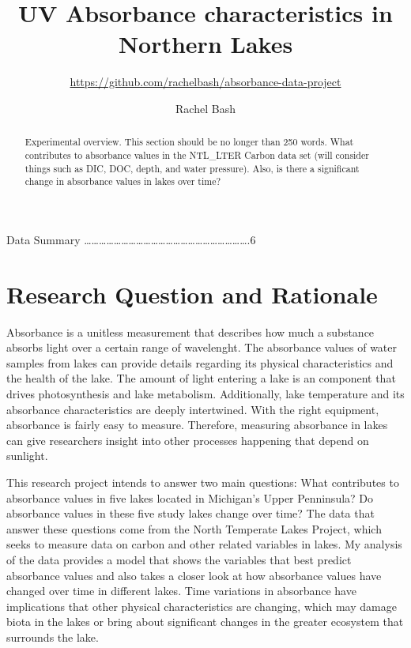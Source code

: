 \documentclass[12pt,]{article}
\title{UV Absorbance characteristics in Northern Lakes}
\subtitle{\url{https://github.com/rachelbash/absorbance-data-project}}
\author{Rachel Bash}
\date{}
\begin{document}
\maketitle
\begin{abstract}
Experimental overview. This section should be no longer than 250 words.
What contributes to absorbance values in the NTL\_LTER Carbon data set
(will consider things such as DIC, DOC, depth, and water pressure).
Also, is there a significant change in absorbance values in lakes over
time?
\end{abstract}

\newpage

\tableofcontents  \newpage
{} Data Summary
\ldots{}\ldots{}\ldots{}\ldots{}\ldots{}\ldots{}\ldots{}\ldots{}\ldots{}\ldots{}\ldots{}\ldots{}\ldots{}\ldots{}\ldots{}\ldots{}\ldots{}\ldots{}\ldots{}\ldots{}\ldots{}\ldots{}.6
\newpage
\listoffigures  \newpage

\section{Research Question and
Rationale}\label{research-question-and-rationale}

Absorbance is a unitless measurement that describes how much a substance
absorbs light over a certain range of wavelenght. The absorbance values
of water samples from lakes can provide details regarding its physical
characteristics and the health of the lake. The amount of light entering
a lake is an component that drives photosynthesis and lake metabolism.
Additionally, lake temperature and its absorbance characteristics are
deeply intertwined. With the right equipment, absorbance is fairly easy
to measure. Therefore, measuring absorbance in lakes can give
researchers insight into other processes happening that depend on
sunlight.

This research project intends to answer two main questions: What
contributes to absorbance values in five lakes located in Michigan's
Upper Penninsula? Do absorbance values in these five study lakes change
over time? The data that answer these questions come from the North
Temperate Lakes Project, which seeks to measure data on carbon and other
related variables in lakes. My analysis of the data provides a model
that shows the variables that best predict absorbance values and also
takes a closer look at how absorbance values have changed over time in
different lakes. Time variations in absorbance have implications that
other physical characteristics are changing, which may damage biota in
the lakes or bring about significant changes in the greater ecosystem
that surrounds the lake.
\end{document}
